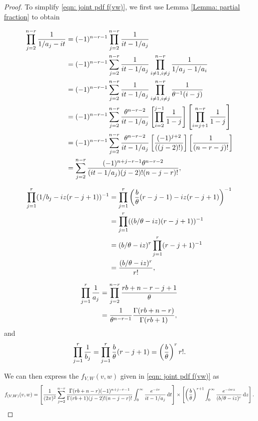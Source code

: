 \documentclass{report}
\begin{document}
\begin{proof}
   To simplify \eqref{eqn: joint pdf f(vw)}, we first use Lemma \ref{Lemma: partial fraction}
   to obtain

   \begin{align*}
      \prodj[2]{n-r} \frac{1}{1/a_j -it} &= (-1)^{n-r-1} \prodj[2]{n-r} \frac{1}{it-1/a_j}
      \\
      &= (-1)^{n-r-1} \sumj[2]{n-r} \frac{1}{it -1/a_j} \prod_{{i\neq 1, i\neq j}}^{n-r} \frac{1}{1/a_j - 1/a_i}
      \\
      &= (-1)^{n-r-1} \sumj[2]{n-r} \frac{1}{it -1/a_j} \prod_{{i\neq 1 , i\neq j}}^{n-r} \frac{1}{\theta^{-1}(i-j)}
      \\
      &= (-1)^{n-r-1} \sumj[2]{n-r} \frac{\theta^{n-r-2}}{it -1/a_j} \left[\prodi[2]{j-1}\frac{1}{1-j}\right] \left[\prodi[j+1]{n-r}\frac{1}{1-j}\right]
      \\
      &= (-1)^{n-r-1} \sumj[2]{n-r} \frac{\theta^{n-r-2}}{it -1/a_j} \left[\frac{(-1)^{j+2}}{((j-2)!)}\right] \left[\frac{1}{(n-r-j)!}\right]
      \\
      &= \sum_{j=2}^{n-r} \frac{(-1)^{n+j-r-1}\theta^{n-r-2}}{(it-1/a_j)(j-2)!(n-j-r)!},
   \end{align*}

    
   \begin{align*}
       \prodj{r} (1/b_j -iz(r-j+1))^{-1} &= \prodj{r}\left(\frac{b}{\theta}(r-j-1)-iz(r-j+1)\right)^{-1}
       \\
       &= \prodj[1]{r}((b/\theta -iz)(r-j+1))^{-1}
       \\
       &= (b/\theta -iz)^{r} \prodj[1]{r} (r-j+1)^{-1}
       \\
       &= \frac{(b/\theta -iz)^{r}}{r!},
   \end{align*}

   \begin{align*}
       \prodj{r} \frac{1}{a_j} &= \prodj[2]{n-r} \frac{rb+n -r -j +1}{\theta}
       \\
       &= \frac{1}{\theta^{n-r-1}} \frac{\Gamma(rb+n-r)}{\Gamma(rb+1)},
   \end{align*}
   and
   \begin{align} \label{eqn: prod 1/b_j}
    \prodj{r} \frac{1}{b_j} = \prodj{r} \frac{b}{\theta}(r-j+1) = \left(\frac{b}{\theta}\right)^r r!.
   \end{align}
    
   We can then express the $f_{V,W}(v,w)$ given in \eqref{eqn: joint pdf f(vw)} as
   \[ 
       f_{(V,W)}(v,w) = \left[ \frac{1}{(2\pi)^2} \sumj[2]{n-r} \frac{\Gamma(rb+n-r)(-1)^{n+j-r-1}}{\Gamma(rb+1)(j-2)!(n-j-r)!}\int_0^\infty \frac{e^{-iv}}{it-1/a_j}\dd{t}\right] \times \left[ \left(\frac{b}{\theta}\right)^{r+1} \int_0^\infty \frac{e^{-iwz}}{(b/\theta -iz)^r}\dd{z}\right].
   \]


\end{proof}
\end{document}
